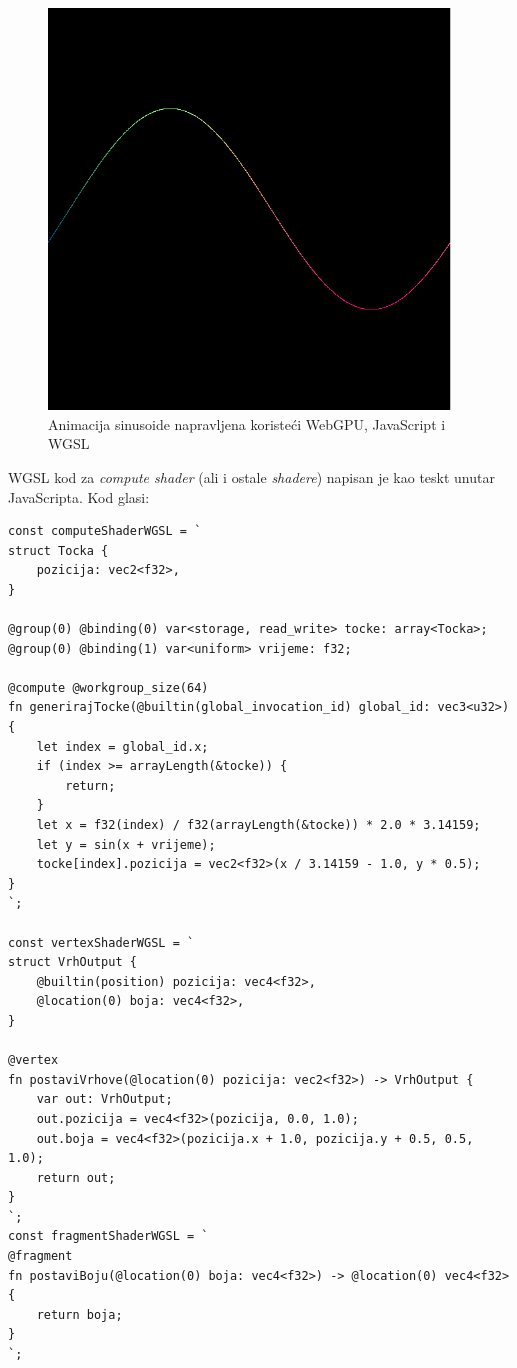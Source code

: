 \documentclass{foi}
\begin{document}
\begin{figure}[H]
	\centering
	\includegraphics[width=0.95\textwidth]{slike/40_WebGPUSinusoida.png}
	\captionsetup{justification=centering}
	\caption{Animacija sinusoide napravljena koristeći WebGPU, JavaScript i WGSL}
	\label{fig:WebGPUSinusoida}
\end{figure}

WGSL kod za \textit{compute shader} (ali i ostale \textit{shadere}) napisan je kao teskt unutar JavaScripta. Kod glasi:

\begin{verbatim}
const computeShaderWGSL = `
struct Tocka {
	pozicija: vec2<f32>,
}

@group(0) @binding(0) var<storage, read_write> tocke: array<Tocka>;
@group(0) @binding(1) var<uniform> vrijeme: f32;

@compute @workgroup_size(64)
fn generirajTocke(@builtin(global_invocation_id) global_id: vec3<u32>) {
	let index = global_id.x;
	if (index >= arrayLength(&tocke)) {
		return;
	}
	let x = f32(index) / f32(arrayLength(&tocke)) * 2.0 * 3.14159;
	let y = sin(x + vrijeme);
	tocke[index].pozicija = vec2<f32>(x / 3.14159 - 1.0, y * 0.5);
}
`;

const vertexShaderWGSL = `
struct VrhOutput {
	@builtin(position) pozicija: vec4<f32>,
	@location(0) boja: vec4<f32>,
}

@vertex
fn postaviVrhove(@location(0) pozicija: vec2<f32>) -> VrhOutput {
	var out: VrhOutput;
	out.pozicija = vec4<f32>(pozicija, 0.0, 1.0);
	out.boja = vec4<f32>(pozicija.x + 1.0, pozicija.y + 0.5, 0.5, 1.0);
	return out;
}
`;
const fragmentShaderWGSL = `
@fragment
fn postaviBoju(@location(0) boja: vec4<f32>) -> @location(0) vec4<f32> {
	return boja;
}
`;
\end{verbatim}
\end{document}
